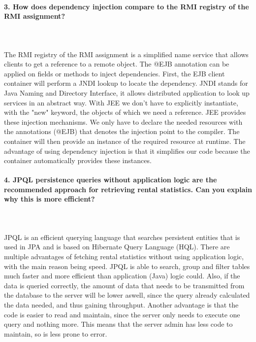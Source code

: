 \documentclass{ds-report}
\begin{document}
	\paragraph{3. How does dependency injection compare to the RMI registry of the RMI assignment?} \mbox{}\\\\
The RMI registry of the RMI assignment is a simplified name service that allows clients to get a reference to a remote object. The @EJB annotation can be applied on fields or methods to inject dependencies. First, the EJB client container will perform a JNDI lookup to locate the dependency. JNDI stands for Java Naming and Directory Interface, it allows distributed application to look up services in an abstract way.
With JEE we don't have to explicitly instantiate, with the "new" keyword, the objects of which we need a reference. JEE provides these injection mechanisms. We only have to declare the needed resources with the annotations (@EJB) that denotes the injection point to the compiler. The container will then provide an instance of the required resource at runtime. The advantage of using dependency injection is that it simplifies our code because the container automatically provides these instances.



	\paragraph{4. JPQL persistence queries without application logic are the recommended approach for retrieving rental statistics. Can you explain why this is more efficient?} \mbox{}\\\\
JPQL is an efficient querying language that searches persistent entities that is used in JPA and is based on Hibernate Query Language (HQL). There are multiple advantages of fetching rental statistics without using application logic, with the main reason being speed. JPQL is able to search, group and filter tables much faster and more efficient than application (Java) logic could. Also, if the data is queried correctly, the amount of data that needs to be transmitted from the database to the server will be lower aswell, since the query already calculated the data needed, and thus gaining throughput. Another advantage is that the code is easier to read and maintain, since the server only needs to execute one query and nothing more. This means that the server admin has less code to maintain, so is less prone to error. 
\end{document}
